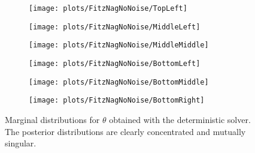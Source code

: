 \begin{figure}[t]
	\centering
	\begin{subfigure}{0.33\linewidth}
		\texttt{[image: plots/FitzNagNoNoise/TopLeft]}
	\end{subfigure}
	\hspace*{.66\textwidth}\quad
	
	\begin{subfigure}{0.32\linewidth}
		\texttt{[image: plots/FitzNagNoNoise/MiddleLeft]}
	\end{subfigure}
	\begin{subfigure}{0.32\linewidth}
		\texttt{[image: plots/FitzNagNoNoise/MiddleMiddle]}
	\end{subfigure}
	\hspace*{.33\textwidth}\quad
	
	\begin{subfigure}{0.32\linewidth}
		\texttt{[image: plots/FitzNagNoNoise/BottomLeft]}
	\end{subfigure}
	\begin{subfigure}{0.32\linewidth}
		\texttt{[image: plots/FitzNagNoNoise/BottomMiddle]}
	\end{subfigure}
	\begin{subfigure}{0.32\linewidth}
		\texttt{[image: plots/FitzNagNoNoise/BottomRight]}
	\end{subfigure}
	\caption{Marginal distributions for $\theta$ obtained with the deterministic solver. The posterior distributions are clearly concentrated and mutually singular.}
	\label{fig:FitzNagDet}
\end{figure}


